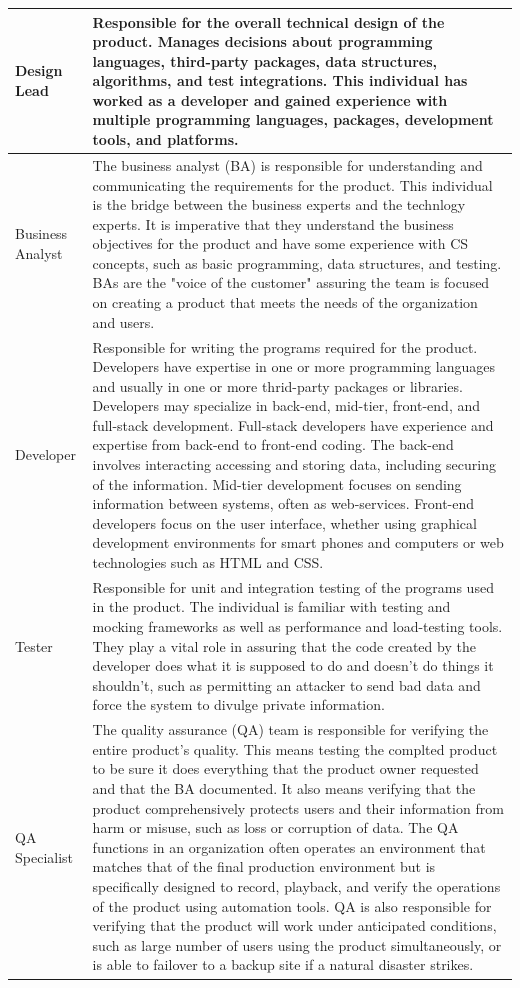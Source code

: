 \begin{longtable}[!htb]{p{.8in}|p{3.6in}}
	\hline
	\Tstrut Design Lead & Responsible for the overall technical design of the product. Manages decisions about programming languages, third-party packages, data structures, algorithms, and test integrations. This individual has worked as a developer and gained experience with multiple programming languages, packages, development tools, and platforms.\\
	\hline
	\Tstrut Business Analyst & The business analyst (BA) is responsible for understanding and communicating the requirements for the product. This individual is the bridge between the business experts and the technlogy experts. It is imperative that they understand the business objectives for the product and have some experience with CS concepts, such as basic programming, data structures, and testing. BAs are the "voice of the customer" assuring the team is focused on creating a product that meets the needs of the organization and users.\\
	\hline
	\Tstrut Developer & Responsible for writing the programs required for the product. Developers have expertise in one or more programming languages and usually in one or more thrid-party packages or libraries. Developers may specialize in back-end, mid-tier, front-end, and full-stack development. Full-stack developers have experience and expertise from back-end to front-end coding. The back-end involves interacting accessing and storing data, including securing of the information. Mid-tier development focuses on sending information between systems, often as web-services. Front-end developers focus on the user interface, whether using graphical development environments for smart phones and computers or web technologies such as HTML and CSS.\\
	\hline
	\Tstrut Tester & Responsible for unit and integration testing of the programs used in the product. The individual is familiar with testing and mocking frameworks as well as performance and load-testing tools. They play a vital role in assuring that the code created by the developer does what it is supposed to do and doesn't do things it shouldn't, such as permitting an attacker to send bad data and force the system to divulge private information.\\
	\hline
	\Tstrut QA \linebreak Specialist & The quality assurance (QA) team is responsible for verifying the entire product's quality. This means testing the complted product to be sure it does everything that the product owner requested and that the BA documented. It also means verifying that the product comprehensively protects users and their information from harm or misuse, such as loss or corruption of data. The QA functions in an organization often operates an environment that matches that of the final production environment but is specifically designed to record, playback, and verify the operations of the product using automation tools. QA is also responsible for verifying that the product will work under anticipated conditions, such as large number of users using the product simultaneously, or is able to failover to a backup site if a natural disaster strikes.\\

\end{longtable}
